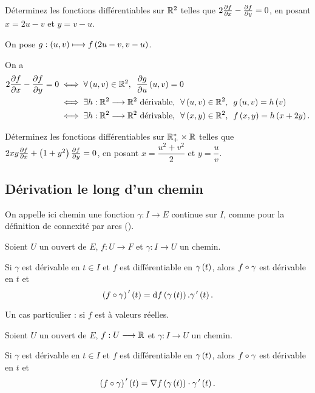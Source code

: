 \begin{exo}
Déterminez les fonctions différentiables sur \(\mathbb{R}^2\) telles que \(2\pdv{f}{x}-\pdv{f}{y}=0\), en posant \(x=2u-v\) et \(y=v-u\).
\end{exo}

\begin{corr}
On pose \(g:\left(u,v\right)\longmapsto f\left(2u-v,v-u\right)\).

On a \[\begin{aligned}
2\pdv{f}{x}-\pdv{f}{y}=0&\ssi\quantifs{\forall\paren{u,v}\in\R^2}\pdv{g}{u}\paren{u,v}=0 \\
&\ssi\quantifs{\exists h:\R^2\to\R^2\text{ dérivable};\forall\paren{u,v}\in\R^2}g\paren{u,v}=h\paren{v} \\
&\ssi\quantifs{\exists h:\R^2\to\R^2\text{ dérivable};\forall\paren{x,y}\in\R^2}f\paren{x,y}=h\paren{x+2y}.
\end{aligned}\]
\end{corr}

\begin{exo}
Déterminez les fonctions différentiables sur \(\mathbb{R}_+^*\times\mathbb{R}\) telles que \(2xy\pdv{f}{x}+\left(1+y^2\right)\pdv{f}{y}=0\), en posant \(x=\dfrac{u^2+v^2}{2}\) et \(y=\dfrac{u}{v}\).
\end{exo}

\subsection{Dérivation le long d'un chemin}

On appelle ici chemin une fonction \(\gamma:I\to E\) continue sur \(I\), comme pour la définition de connexité par arcs (\cf {}).

\begin{prop}
Soient \(U\) un ouvert de \(E\), \(f:U\to F\) et \(\gamma:I\to U\) un chemin.

Si \(\gamma\) est dérivable en \(t\in I\) et \(f\) est différentiable en \(\gamma\left(t\right)\), alors \(f\circ\gamma\) est dérivable en \(t\) et \[\paren{f\rond\gamma}\prim\paren{t}=\odif{f}\paren{\gamma\paren{t}}.\gamma\prim\paren{t}.\]
\end{prop}

Un cas particulier : si \(f\) est à valeurs réelles.

\begin{prop}
Soient \(U\) un ouvert de \(E\), \(f:U\longrightarrow\mathbb{R}\) et \(\gamma:I\to U\) un chemin.

Si \(\gamma\) est dérivable en \(t\in I\) et \(f\) est différentiable en \(\gamma\left(t\right)\), alors \(f\circ\gamma\) est dérivable en \(t\) et \[\left(f\circ\gamma\right)^{\,\prime}\left(t\right)=\nabla f\left(\gamma\left(t\right)\right)\cdot\gamma^{\,\prime}\left(t\right).\]
\end{prop}

